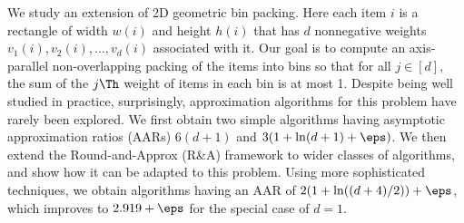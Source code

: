 We study an extension of 2D geometric bin packing.
Here each item $i$ is a rectangle of width $w(i)$ and height $h(i)$
that has $d$ nonnegative weights $v_1(i), v_2(i), \ldots, v_d(i)$ associated with it.
Our goal is to compute an axis-parallel non-overlapping packing of the items into bins so that
for all $j \in [d]$, the sum of the $j\Th$ weight of items in each bin is at most 1.
Despite being well studied in practice, surprisingly,
approximation algorithms for this problem have rarely been explored.
We first obtain two simple algorithms having asymptotic approximation ratios (AARs)
$6(d+1)$ and $3(1 + \ln(d+1) + \eps)$.
We then extend the Round-and-Approx (R\&A) framework
\texorpdfstring{\cite{bansal2014binpacking}}{[Bansal-Khan, SODA'14]}
to wider classes of algorithms, and show how it can be adapted to this problem.
Using more sophisticated techniques, we obtain algorithms having
an AAR of $2(1+\ln((d+4)/2))+\eps$,
which improves to $2.919+\eps$ for the special case of $d=1$.
